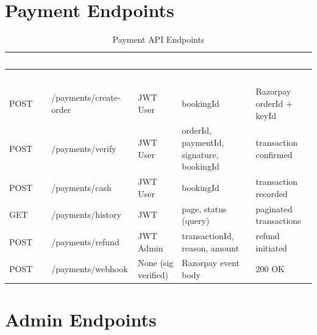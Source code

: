 \documentclass[12pt,a4paper]{report}
\newcommand{\thead}[1]{\cellcolor{tableheader}\textcolor{white}{\textbf{#1}}}
\begin{document}
\section{Payment Endpoints}

\begin{longtable}{|p{1cm}|p{3.5cm}|p{1.5cm}|p{3.5cm}|p{3cm}|}
\caption{Payment API Endpoints}\label{tab:paymentapi}\\
\hline
\thead{Method} & \thead{Endpoint} & \thead{Auth} & \thead{Body} & \thead{Response} \\
\hline
\endfirsthead
\hline
\thead{Method} & \thead{Endpoint} & \thead{Auth} & \thead{Body} & \thead{Response} \\
\hline
\endhead
POST & /payments/create-order & JWT User & bookingId & Razorpay orderId + keyId \\
\hline
POST & /payments/verify & JWT User & orderId, paymentId, signature, bookingId & transaction confirmed \\
\hline
POST & /payments/cash & JWT User & bookingId & transaction recorded \\
\hline
GET & /payments/history & JWT & page, status (query) & paginated transactions \\
\hline
POST & /payments/refund & JWT Admin & transactionId, reason, amount & refund initiated \\
\hline
POST & /payments/webhook & None (sig verified) & Razorpay event body & 200 OK \\
\hline
\end{longtable}

\section{Admin Endpoints}
\end{document}
